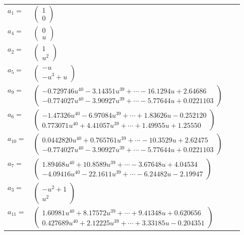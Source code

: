 \documentclass[1p]{elsarticle_modified}
\theoremstyle{definition}
\begin{document}
\begin{tabular}{m{7pt} m{180pt} m{7pt} m{180pt} }
\flushright $a_{1}=$&$\begin{pmatrix}1\\0\end{pmatrix}$ \\
\flushright $a_{4}=$&$\begin{pmatrix}0\\u\end{pmatrix}$ \\
\flushright $a_{2}=$&$\begin{pmatrix}1\\u^2\end{pmatrix}$ \\
\flushright $a_{5}=$&$\begin{pmatrix}- u\\- u^3+u\end{pmatrix}$ \\
\flushright $a_{9}=$&$\begin{pmatrix}-0.729746 u^{40}-3.14351 u^{39}+\cdots-16.1294 u+2.64686\\-0.774027 u^{40}-3.90927 u^{39}+\cdots-5.77644 u+0.0221103\end{pmatrix}$ \\
\flushright $a_{6}=$&$\begin{pmatrix}-1.47326 u^{40}-6.97084 u^{39}+\cdots+1.83626 u-0.252120\\0.773071 u^{40}+4.41057 u^{39}+\cdots+1.49955 u+1.25550\end{pmatrix}$ \\
\flushright $a_{10}=$&$\begin{pmatrix}0.0442820 u^{40}+0.765761 u^{39}+\cdots-10.3529 u+2.62475\\-0.774027 u^{40}-3.90927 u^{39}+\cdots-5.77644 u+0.0221103\end{pmatrix}$ \\
\flushright $a_{7}=$&$\begin{pmatrix}1.89468 u^{40}+10.8589 u^{39}+\cdots-3.67648 u+4.04534\\-4.09416 u^{40}-22.1611 u^{39}+\cdots-6.24482 u-2.19947\end{pmatrix}$ \\
\flushright $a_{3}=$&$\begin{pmatrix}- u^2+1\\u^2\end{pmatrix}$ \\
\flushright $a_{11}=$&$\begin{pmatrix}1.60981 u^{40}+8.17572 u^{39}+\cdots+9.41348 u+0.620656\\0.427689 u^{40}+2.12225 u^{39}+\cdots+3.33185 u-0.204351\end{pmatrix}$ \\

\end{tabular}
\end{document}
